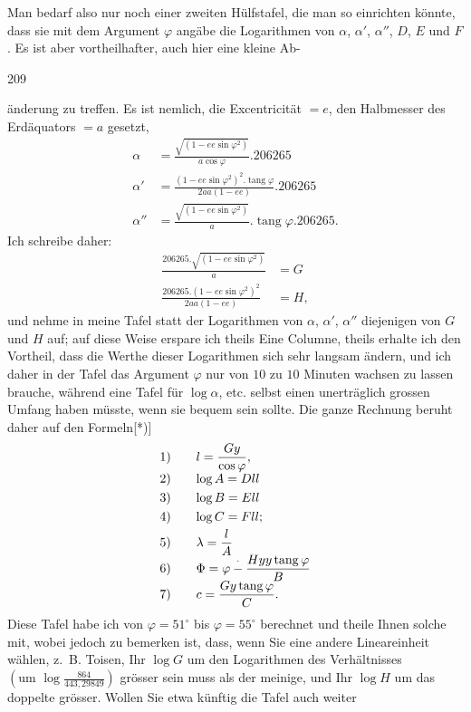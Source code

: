 Man bedarf also nur noch einer zweiten Hülfstafel, die man so einrichten könnte, dass sie mit dem Argument $\varphi$ angäbe die Logarithmen von $\alpha$, $\alpha'$, $\alpha''$, $D$, $E$ und $F$. Es ist aber vortheilhafter, auch hier eine kleine Ab-\par
\clearpage
{}\hfill209\par\medskip
\noindent änderung zu treffen. Es ist nemlich, die Excentricität $=e$, den Halbmesser des Erdäquators $=a$ gesetzt,
\[
\begin{aligned}
\alpha&=\frac{\sqrt{(1-ee\sin\varphi^2)}}{a\cos\varphi}.206265\\
\alpha'&=\frac{(1-ee\sin\varphi^2)^2.\operatorname{tang}\varphi}{2aa(1-ee)}.206265\\
\alpha''&=\frac{\sqrt{(1-ee\sin\varphi^2)}}a.\operatorname{tang}\varphi.206265.
\end{aligned}
\]
Ich schreibe daher:
\[
\begin{aligned}
\frac{206265.\sqrt{(1-ee\sin\varphi^2)}}a&=G\\
\frac{206265.(1-ee\sin\varphi^2)^2}{2aa(1-ee)}&=H,
\end{aligned}
\]
und nehme in meine Tafel statt der Logarithmen von $\alpha$, $\alpha'$, $\alpha''$ diejenigen von $G$ und $H$ auf; auf diese Weise erspare ich theils Eine Columne, theils erhalte ich den Vortheil, dass die Werthe dieser Logarithmen sich sehr langsam ändern, und ich daher in der Tafel das Argument $\varphi$ nur von $10$ zu $10$ Minuten wachsen zu lassen brauche, während eine Tafel für $\log\alpha$, etc. selbst einen unerträglich grossen Umfang haben müsste, wenn sie bequem sein sollte. Die ganze Rechnung beruht daher auf den Formeln[*)]
\[
\begin{array}{r@{\qquad}l}
1)&\displaystyle l=\frac{Gy}{\cos\varphi},\\[3pt]
2)&\log A=Dll\\[3pt]
3)&\log B=Ell\\[3pt]
4)&\log C=Fll;\\[3pt]
5)&\displaystyle\lambda=\frac lA\\[3pt]
6)&\displaystyle\Phi=\varphi\mathbin{\overset{\raisebox{.15ex}{\scriptsize.}}{-}}\frac{Hyy\operatorname{tang}\varphi}{B}\\[3pt]
7)&\displaystyle c=\frac{Gy\operatorname{tang}\varphi}{C}.
\end{array}
\]
Diese Tafel habe ich von $\varphi=51^\circ$ bis $\varphi=55^\circ$ berechnet und theile Ihnen solche mit, wobei jedoch zu bemerken ist, dass, wenn Sie eine andere Lineareinheit wählen, z.~B. Toisen, Ihr $\log G$ um den Logarithmen des Verhältnisses $\left(\text{um }\log\frac{864}{443{,}29849}\right)$ grösser sein muss als der meinige, und Ihr $\log H$ um das doppelte grösser. Wollen Sie etwa künftig die Tafel auch weiter
